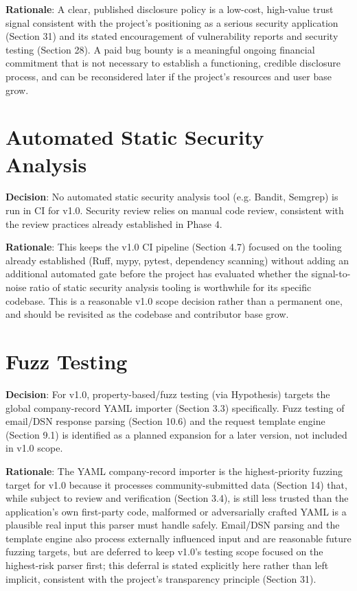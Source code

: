 \textbf{Rationale}: A clear, published disclosure policy is a low-cost, high-value trust signal consistent with the project's positioning as a serious security application (Section 31) and its stated encouragement of vulnerability reports and security testing (Section 28). A paid bug bounty is a meaningful ongoing financial commitment that is not necessary to establish a functioning, credible disclosure process, and can be reconsidered later if the project's resources and user base grow.
\section{Automated Static Security Analysis}
\textbf{Decision}: No automated static security analysis tool (e.g. Bandit, Semgrep) is run in CI for v1.0. Security review relies on manual code review, consistent with the review practices already established in Phase 4.

\textbf{Rationale}: This keeps the v1.0 CI pipeline (Section 4.7) focused on the tooling already established (Ruff, mypy, pytest, dependency scanning) without adding an additional automated gate before the project has evaluated whether the signal-to-noise ratio of static security analysis tooling is worthwhile for its specific codebase. This is a reasonable v1.0 scope decision rather than a permanent one, and should be revisited as the codebase and contributor base grow.
\section{Fuzz Testing}
\textbf{Decision}: For v1.0, property-based/fuzz testing (via Hypothesis) targets the global company-record YAML importer (Section 3.3) specifically. Fuzz testing of email/DSN response parsing (Section 10.6) and the request template engine (Section 9.1) is identified as a planned expansion for a later version, not included in v1.0 scope.

\textbf{Rationale}: The YAML company-record importer is the highest-priority fuzzing target for v1.0 because it processes community-submitted data (Section 14) that, while subject to review and verification (Section 3.4), is still less trusted than the application's own first-party code, malformed or adversarially crafted YAML is a plausible real input this parser must handle safely. Email/DSN parsing and the template engine also process externally influenced input and are reasonable future fuzzing targets, but are deferred to keep v1.0's testing scope focused on the highest-risk parser first; this deferral is stated explicitly here rather than left implicit, consistent with the project's transparency principle (Section 31).
